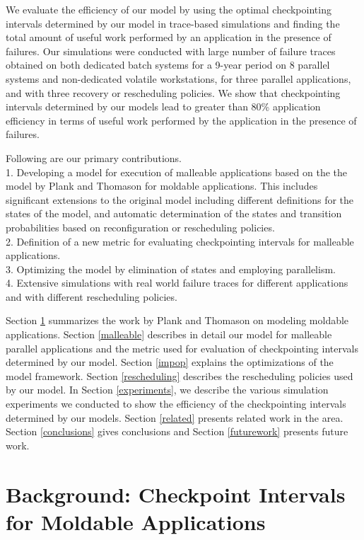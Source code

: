 \documentclass[conference,10pt]{IEEEtran}
\begin{document}
We evaluate the efficiency of our model by using the optimal
checkpointing intervals determined by our model in trace-based
simulations and finding the total amount of useful work performed by
an application in the presence of failures. Our simulations were
conducted with large number of failure traces obtained on both
dedicated batch systems for a 9-year period on 8 parallel systems
and non-dedicated volatile workstations, for three parallel applications,
and with three recovery or rescheduling policies. We show that
checkpointing intervals determined by our models lead to greater than
80\% application efficiency in terms of
useful work
performed by the application in the presence of failures.

Following are our primary contributions. \\
1. Developing a model for execution of malleable applications
   based on the the model by Plank and Thomason for moldable
   applications. This includes significant extensions to the original
   model including different definitions for the states of the model,
   and automatic determination of the states and transition
   probabilities based on reconfiguration or rescheduling policies. \\
2. Definition of a new metric for evaluating checkpointing
  intervals for malleable applications. \\
3. Optimizing the model by elimination of states and employing
  parallelism. \\
4. Extensive simulations with real world failure traces for
  different applications and with different rescheduling policies.

Section \ref{background} summarizes the work by Plank and Thomason on
modeling moldable applications. Section \ref{malleable} describes in
detail our model for malleable parallel applications and the metric
used for evaluation of checkpointing intervals determined by our
model. Section \ref{impop} explains the optimizations of the model
framework. Section \ref{rescheduling} describes the rescheduling
policies used by our model. In Section \ref{experiments}, we describe
the various simulation experiments we conducted to show the efficiency
of the checkpointing intervals determined by our models. Section
\ref{related} presents related work in the area. Section
\ref{conclusions} gives conclusions and Section \ref{futurework}
presents future work.

\section{Background: Checkpoint Intervals for Moldable Applications}
\label{background}
\end{document}
